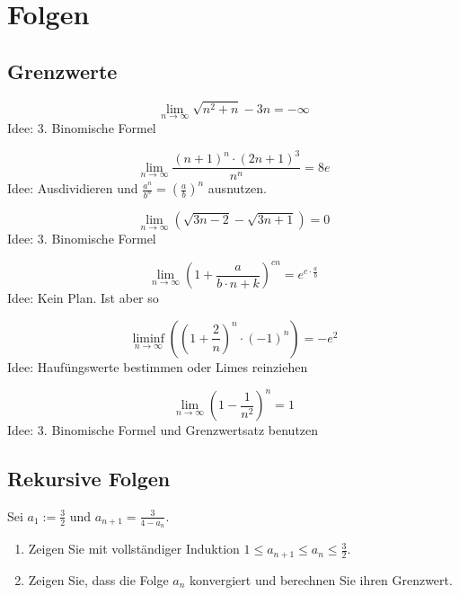 \documentclass[parskip=full]{scrartcl}
\begin{document}
\maketitle

\tableofcontents

\section{Folgen}
\subsection{Grenzwerte}
\begin{displaymath}
  \lim_{n \to \infty} {\sqrt{n^2 + n} - 3n} = - \infty
\end{displaymath}
Idee: 3. Binomische Formel

\begin{displaymath}
  \lim_{n \to \infty} \frac{(n+1)^n \cdot (2n+1)^3}{n^n} = 8e
\end{displaymath}
Idee: Ausdividieren und $\frac{a^n}{b^n} = \left( \frac{a}{b}\right) ^n$ ausnutzen.

\begin{displaymath}
  \lim_{n \to \infty} (\sqrt{3n-2} - \sqrt{3n+1}) = 0
\end{displaymath}
Idee: 3. Binomische Formel

\begin{displaymath}
  \lim_{n \to \infty} \left(1 + \frac{a}{b \cdot n + k}\right)^{cn} = e^{c \cdot \frac{a}{b}}
\end{displaymath}
Idee: Kein Plan. Ist aber so

\begin{displaymath}
  \liminf_{n \to \infty} \left(\left(1 + \frac{2}{n}\right)^n \cdot (-1)^n \right) = -e^2
\end{displaymath}
Idee: Haufüngswerte bestimmen oder Limes reinziehen

\begin{displaymath}
  \lim_{n \to \infty} \left(1 - \frac{1}{n^2}\right)^n = 1
\end{displaymath}
Idee: 3. Binomische Formel und Grenzwertsatz benutzen

\subsection{Rekursive Folgen}
Sei $a_1 := \frac{3}{2}$ und $a_{n+1} = \frac{3}{4-a_n}$.
\begin{enumerate}
    \item Zeigen Sie mit vollständiger Induktion $1 \leq a_{n+1} \leq a_n \leq \frac{3}{2}$.
    \item Zeigen Sie, dass die Folge $a_n$ konvergiert und berechnen Sie ihren Grenzwert.
\end{enumerate}
\end{document}
